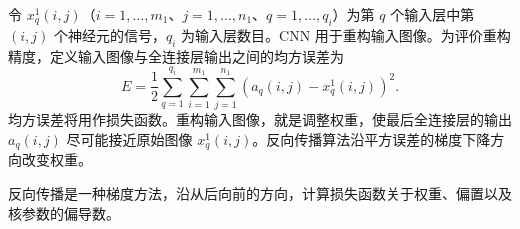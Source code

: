 
令 $x_q^1(i,j)$（$i=1,\ldots,m_1$、$j=1,\ldots,n_1$、$q=1,\ldots,q_i$）为第 $q$ 个输入层中第 $(i,j)$ 个神经元的信号，$q_i$ 为输入层数目。CNN 用于重构输入图像。为评价重构精度，定义输入图像与全连接层输出之间的均方误差为
\begin{equation}
E=\frac12\sum_{q=1}^{q_i}\sum_{i=1}^{m_1}\sum_{j=1}^{n_1}(a_q(i,j)-x_q^1(i,j))^2.
\tag{6.111}
\end{equation}
均方误差将用作损失函数。重构输入图像，就是调整权重，使最后全连接层的输出 $a_q(i,j)$ 尽可能接近原始图像 $x_q^1(i,j)$。反向传播算法沿平方误差的梯度下降方向改变权重。


反向传播是一种梯度方法，沿从后向前的方向，计算损失函数关于权重、偏置以及核参数的偏导数。


